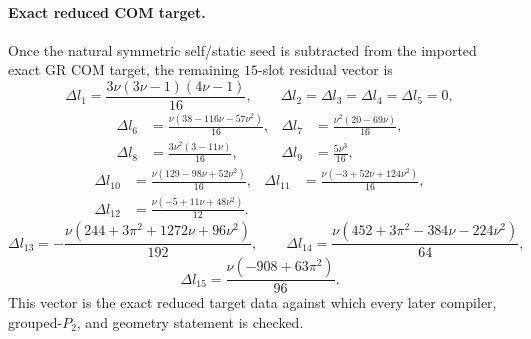 \documentclass[11pt]{article}
\begin{document}
\paragraph{Exact reduced COM target.}
Once the natural symmetric self/static seed is subtracted from the imported exact
GR COM target, the remaining $15$-slot residual vector is
\[
\Delta l_1=\frac{3\nu(3\nu-1)(4\nu-1)}{16},
\qquad
\Delta l_2=\Delta l_3=\Delta l_4=\Delta l_5=0,
\]
\[
\begin{aligned}
\Delta l_6&=\frac{\nu(38-116\nu-57\nu^2)}{16},
& \Delta l_7&=\frac{\nu^2(20-69\nu)}{16},
\\
\Delta l_8&=\frac{3\nu^2(3-11\nu)}{16},
& \Delta l_9&=\frac{5\nu^3}{16},
\end{aligned}
\]
\[
\begin{aligned}
\Delta l_{10}&=\frac{\nu(129-98\nu+52\nu^2)}{16},
& \Delta l_{11}&=\frac{\nu(-3+52\nu+124\nu^2)}{16},
\\
\Delta l_{12}&=\frac{\nu(-5+11\nu+48\nu^2)}{12}.
\end{aligned}
\]
\[
\Delta l_{13}=-\frac{\nu(244+3\pi^2+1272\nu+96\nu^2)}{192},
\qquad
\Delta l_{14}=\frac{\nu(452+3\pi^2-384\nu-224\nu^2)}{64},
\]
\[
\Delta l_{15}=\frac{\nu(-908+63\pi^2)}{96}.
\]
This vector is the exact reduced target data against which every later
compiler, grouped-$P_2$, and geometry statement is checked.
\end{document}
